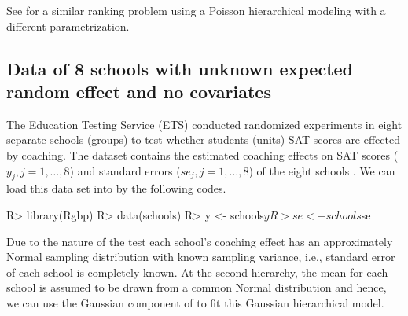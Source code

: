 \documentclass[article]{jss}
\begin{document}

See \cite{1995} for a similar ranking problem using a Poisson hierarchical modeling with a different parametrization.


\subsection[Unknown Second-level Mean and No Covariate]{Data of 8 schools with unknown expected random effect and no covariates} \label{sec:ex:8schools}

The Education Testing Service (ETS) conducted randomized experiments in eight separate schools (groups) to test whether students (units) SAT scores are effected by coaching. The dataset contains the estimated coaching effects on SAT scores ($y_{j}, j=1, \ldots, 8$) and standard errors ($se_{j}, j=1, \ldots, 8$) of the eight schools \citep{1981}. We can load this data set into  by the following codes.
\begin{CodeChunk}
\begin{CodeInput}
R> library(Rgbp)
R> data(schools)
R> y  <- schools$y
R> se <- schools$se
\end{CodeInput}
\end{CodeChunk}



Due to the nature of the test each school's coaching effect has an approximately Normal sampling distribution with known sampling variance, i.e., standard error of each school is completely known. At the second hierarchy, the mean for each school is assumed to be drawn from a common Normal distribution and hence, we can use the Gaussian component of  to fit this Gaussian hierarchical model.
\end{document}
